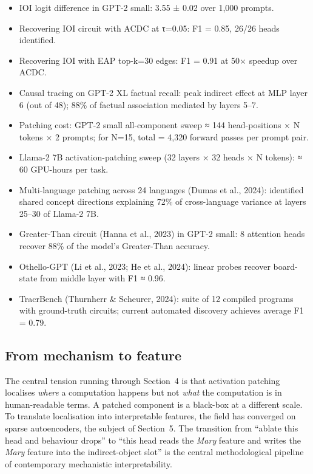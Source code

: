 \begin{itemize}
\tightlist
\item
  IOI logit difference in GPT-2 small: 3.55 ± 0.02 over 1,000 prompts.
\item
  Recovering IOI circuit with ACDC at τ=0.05: F1 = 0.85, 26/26 heads identified.
\item
  Recovering IOI with EAP top-k=30 edges: F1 = 0.91 at 50× speedup over ACDC.
\item
  Causal tracing on GPT-2 XL factual recall: peak indirect effect at MLP layer 6 (out of 48); 88\% of factual association mediated by layers 5--7.
\item
  Patching cost: GPT-2 small all-component sweep ≈ 144 head-positions × N tokens × 2 prompts; for N=15, total = 4,320 forward passes per prompt pair.
\item
  Llama-2 7B activation-patching sweep (32 layers × 32 heads × N tokens): ≈ 60 GPU-hours per task.
\item
  Multi-language patching across 24 languages (Dumas et al., 2024): identified shared concept directions explaining 72\% of cross-language variance at layers 25--30 of Llama-2 7B.
\item
  Greater-Than circuit (Hanna et al., 2023) in GPT-2 small: 8 attention heads recover 88\% of the model's Greater-Than accuracy.
\item
  Othello-GPT (Li et al., 2023; He et al., 2024): linear probes recover board-state from middle layer with F1 ≈ 0.96.
\item
  TracrBench (Thurnherr \& Scheurer, 2024): suite of 12 compiled programs with ground-truth circuits; current automated discovery achieves average F1 = 0.79.
\end{itemize}

\subsection{From mechanism to feature}\label{from-mechanism-to-feature}

The central tension running through Section~4 is that activation patching localises \emph{where} a computation happens but not \emph{what} the computation is in human-readable terms. A patched component is a black-box at a different scale. To translate localisation into interpretable features, the field has converged on sparse autoencoders, the subject of Section~5. The transition from ``ablate this head and behaviour drops'' to ``this head reads the \emph{Mary} feature and writes the \emph{Mary} feature into the indirect-object slot'' is the central methodological pipeline of contemporary mechanistic interpretability.

